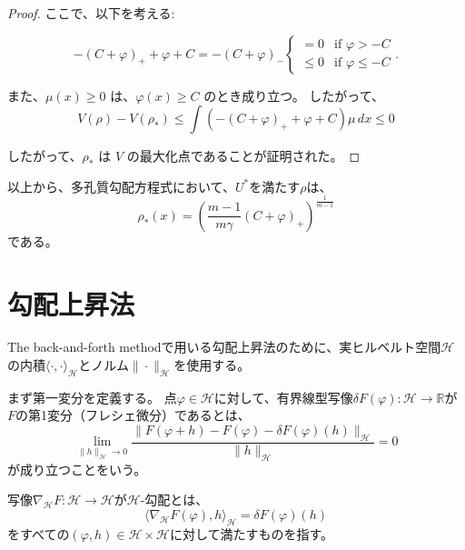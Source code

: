 \begin{proof}
    ここで、以下を考える$:$

    \[
        - (C + \varphi)_+ + \varphi + C = - (C + \varphi)_- \begin{cases} = 0 & \text{if } \varphi > - C \\ 
                                                                    \leq 0 & \text{if } \varphi \leq - C \end{cases}.
    \]
    
    また、\(\mu(x) \geq 0\) は、\(\varphi(x) \geq C\) のとき成り立つ。
    したがって、
    \[
        V(\rho) - V(\rho_*) \leq \int (- (C + \varphi)_+ + \varphi + C) \mu \, dx \leq 0
    \]

    したがって、\(\rho_*\) は \(V\) の最大化点であることが証明された。
\end{proof}

以上から、多孔質勾配方程式において、$U^*$を満たす$\rho$は、
\begin{equation}
    \label{eq:PMErho}
    \rho_*(x) = \left( \frac{m-1}{m\gamma}(C + \varphi)_+ \right)^{\frac{1}{m-1}} 
\end{equation}
である。


\section{勾配上昇法}
\label{sect:勾配上昇法}
The back-and-forth methodで用いる勾配上昇法のために、実ヒルベルト空間$\mathcal{H}$の内積$\langle\cdot,\cdot\rangle_\mathcal{H}$とノルム$\|\cdot\|_\mathcal{H}$を使用する。

まず第一変分を定義する。
点$\varphi\in \mathcal{H}$に対して、有界線型写像$\delta F(\varphi): \mathcal{H} \to \mathbb{R}$が$F$の第1変分（フレシェ微分）であるとは、
    \[
        \lim_{\|h\|_{\mathcal{H}} \to 0} \frac{\|F(\varphi + h) - F(\varphi) - \delta F(\varphi)(h)\|_{\mathcal{H}}}{\|h\|_{\mathcal{H}}} = 0
    \]
が成り立つことをいう。

\begin{dfn}
    写像$\nabla_\mathcal{H} F: \mathcal{H} \to \mathcal{H}$が$\mathcal{H}$-勾配とは、
    \[
        \langle \nabla_\mathcal{H} F(\varphi), h \rangle_\mathcal{H} = \delta F(\varphi)(h)
    \]
    をすべての$(\varphi, h) \in \mathcal{H} \times \mathcal{H}$に対して満たすものを指す。
\end{dfn}

